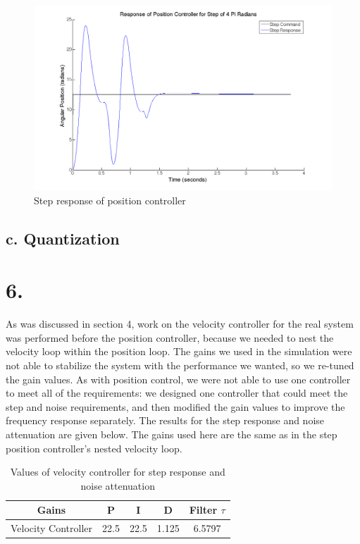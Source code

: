 \documentclass{article}
\theoremstyle{plain}
\theoremstyle{definition}
\theoremstyle{remark}
\begin{document}
\begin{figure}
\begin{center}
\includegraphics[width = 14cm]{posstep_4pi.png}
\caption{Step response of position controller}
\label{q5_b5}
\end{center}
\end{figure}

\subsection*{c. Quantization}

\section*{6.}
As was discussed in section 4, work on the velocity controller for the real system was performed before the position controller, because we needed to nest the velocity loop within the position loop. The gains we used in the simulation were not able to stabilize the system with the performance we wanted, so we re-tuned the gain values. As with position control, we were not able to use one controller to meet all of the requirements: we designed one controller that could meet the step and noise requirements, and then modified the gain values to improve the frequency response separately. The results for the step response and noise attenuation are given below. The gains used here are the same as in the step position controller's nested velocity loop. 

\begin{table}[htb]
\begin{center}
    \begin{tabular}{|c|c|c|c|c|}
        \hline
        Gains & P   & I & D     & Filter $\tau$   \\ \hline
        Velocity Controller       & 22.5   & 22.5    & 1.125    & 6.5797  \\ 
       \hline
    \end{tabular}
\end{center}
\caption{Values of velocity controller for step response and noise attenuation}
\label{velocityGains}
\end{table}
\end{document}
